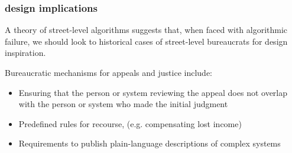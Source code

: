 \documentclass[presentation]{subfiles}
\begin{document}
\begin{frame}[t]\frametitle{design implications}
    
A theory of street-level algorithms suggests that, when faced with algorithmic failure, we should look to historical cases of street-level bureaucrats for design inspiration.

Bureaucratic mechanisms for appeals and justice include:
\begin{itemize}
  \item Ensuring that the person or system reviewing the appeal does not overlap with the person or system who made the initial judgment
  \item Predefined rules for recourse, (e.g. compensating lost income)
  \item Requirements to publish plain-language descriptions of complex systems
\end{itemize}

\end{frame}
\end{document}
